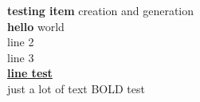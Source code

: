 \documentclass[10pt]{article}
\begin{document}
\textbullet \textbf{testing item} creation and generation\\ 
\textbullet \textbf{hello} world\\ 
\textbullet line 2\\ 
line 3\\ 
\underline{\textbf{line test}}\\ 
just a lot of text BOLD test\\ 
\end{document}
